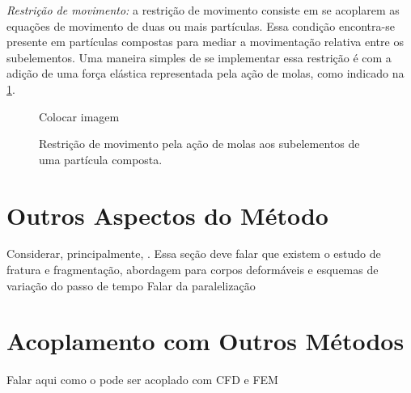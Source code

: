 \begin{alineas}
\item \textit{Restrição de movimento:} a restrição de movimento consiste em se acoplarem as equações de movimento de duas ou mais partículas. Essa condição encontra-se presente em partículas compostas para mediar a movimentação relativa entre os subelementos. Uma maneira simples de se implementar essa restrição é com a adição de uma força elástica representada pela ação de molas, como indicado na \cref{fig:boundary_conditions:restrition}.

\begin{figure}[h]
	\caption{Restrição de movimento pela ação de molas aos subelementos de uma partícula composta.}
	\centering
		\alert{Colocar imagem}
	\label{fig:boundary_conditions:restrition}
\end{figure}
\end{alineas}

\section{Outros Aspectos do Método}
\alert{Considerar, principalmente, . Essa seção deve falar que existem o estudo de fratura e fragmentação, abordagem para corpos deformáveis e esquemas de variação do passo de tempo}
\alert{Falar da paralelização}

\section{Acoplamento com Outros Métodos}
\alert{Falar aqui como o \DEM{} pode ser acoplado com CFD e FEM}